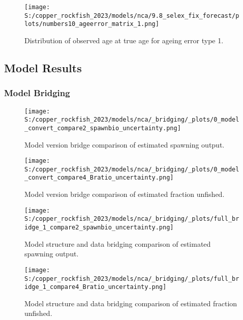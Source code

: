 \documentclass[11pt,
  english,
  letterpaper,
]{article}
\begin{document}
\pagebreak

\begin{figure}
\centering
\texttt{[image: S:/copper\_rockfish\_2023/models/nca/9.8\_selex\_fix\_forecast/plots/numbers10\_ageerror\_matrix\_1.png]}
\caption{Distribution of observed age at true age for ageing error type 1.\label{fig:age-error-matrix}}
\end{figure}

\pagebreak

\hypertarget{model-results}{%
\subsection{Model Results}\label{model-results}}

\hypertarget{model-bridging}{%
\subsubsection{Model Bridging}\label{model-bridging}}

\begin{figure}
\centering
\texttt{[image: S:/copper\_rockfish\_2023/models/nca/\_bridging/\_plots/0\_model\_convert\_compare2\_spawnbio\_uncertainty.png]}
\caption{Model version bridge comparison of estimated spawning output.\label{fig:bridge-ssb}}
\end{figure}

\pagebreak

\begin{figure}
\centering
\texttt{[image: S:/copper\_rockfish\_2023/models/nca/\_bridging/\_plots/0\_model\_convert\_compare4\_Bratio\_uncertainty.png]}
\caption{Model version bridge comparison of estimated fraction unfished.\label{fig:bridge-depl}}
\end{figure}

\pagebreak

\begin{figure}
\centering
\texttt{[image: S:/copper\_rockfish\_2023/models/nca/\_bridging/\_plots/full\_bridge\_1\_compare2\_spawnbio\_uncertainty.png]}
\caption{Model structure and data bridging comparison of estimated spawning output.\label{fig:data-bridge-ssb-1}}
\end{figure}

\pagebreak

\begin{figure}
\centering
\texttt{[image: S:/copper\_rockfish\_2023/models/nca/\_bridging/\_plots/full\_bridge\_1\_compare4\_Bratio\_uncertainty.png]}
\caption{Model structure and data bridging comparison of estimated fraction unfished.\label{fig:data-bridge-depl-1}}
\end{figure}
\end{document}
